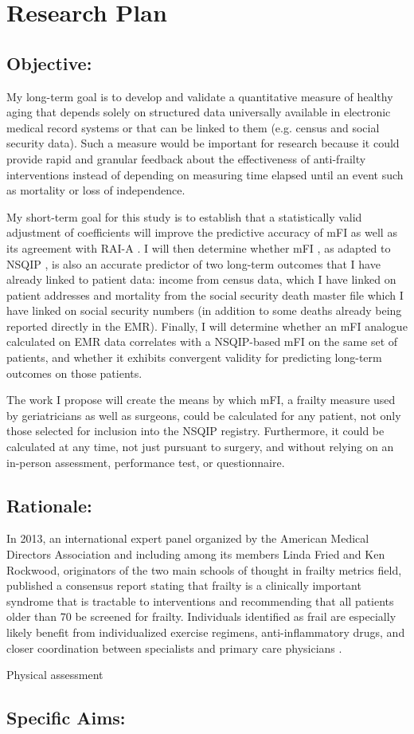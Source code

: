 \section{Research Plan }\label{research-plan}


\subsection{Objective:}\label{objective}
  
My long-term goal is to develop and validate a quantitative measure of healthy aging that depends solely on structured data universally available in electronic medical record systems or that can be linked to them (e.g. census and social security data). Such a measure would be important for research because it could provide rapid and granular feedback about the effectiveness of anti-frailty interventions instead of depending on measuring time elapsed until an event such as mortality or loss of independence. 

My short-term goal for this study is to establish that a statistically valid adjustment of coefficients will improve the predictive accuracy of mFI as well as its agreement with RAI-A \cite{Isharwal_2016,Melin_2015}. I will then determine whether mFI \cite{Rockwood_2005}, as adapted to NSQIP \cite{Tsiouris_2013}, is also an accurate predictor of two long-term outcomes that I have already linked to patient data: income from census data, which I have linked on patient addresses and mortality from the social security death master file which I have linked on social security numbers (in addition to some deaths already being reported directly in the EMR). Finally, I will determine whether an mFI analogue calculated on EMR data correlates with a NSQIP-based mFI on the same set of patients, and whether it exhibits convergent validity for predicting long-term outcomes on those patients. 

The work I propose will create the means by which mFI, a frailty measure used by geriatricians as well as surgeons, could be calculated for any patient, not only those selected for inclusion into the NSQIP registry. Furthermore, it could be calculated at any time, not just pursuant to surgery, and without relying on an in-person assessment, performance test, or questionnaire.

\subsection{Rationale:}\label{rationale}
In 2013, an international expert panel organized by the American Medical Directors Association and including among its members Linda Fried and Ken Rockwood, originators of the two main schools of thought in frailty metrics field, published a consensus report \cite{Morley_2013} stating that frailty is a clinically important syndrome that is tractable to interventions and recommending that all patients older than 70 be screened for frailty. Individuals identified as frail are especially likely benefit from individualized exercise regimens, anti-inflammatory drugs, and closer coordination between specialists and primary care physicians \citep{16392724}.

Physical assessment 

\subsection{Specific Aims:}\label{specific-aims}
